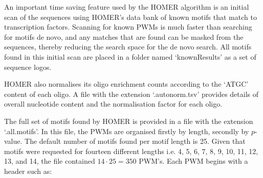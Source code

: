 \documentclass[12pt]{article}
\begin{document}
An important time saving feature used by the HOMER algorithm is an initial scan of the sequences using HOMER's data bank of known motifs that match to transcription factors. Scanning for known PWMs is much faster than searching for motifs de novo, and any matches that are found can be masked from the sequences, thereby reducing the search space for the de novo search. All motifs found in this initial scan are placed in a folder named `knownResults' as a set of sequence logos.

HOMER also normalises its oligo enrichment counts according to the `ATGC' content of each oligo. A file with the extension `.autonorm.tsv' provides details of overall nucleotide content and the normalisation factor for each oligo.

The full set of motifs found by HOMER is provided in a file with the extension `.all.motifs'. In this file, the PWMs are organised firstly by length, secondly by $p$-value. The default number of motifs found per motif length is 25. Given that motifs were requested for fourteen different lengths i.e. 4, 5, 6, 7, 8, 9, 10, 11, 12, 13, and 14, the file contained $14 \cdot 25 = 350$ PWM's. Each PWM begins with a header such as: 
\end{document}
